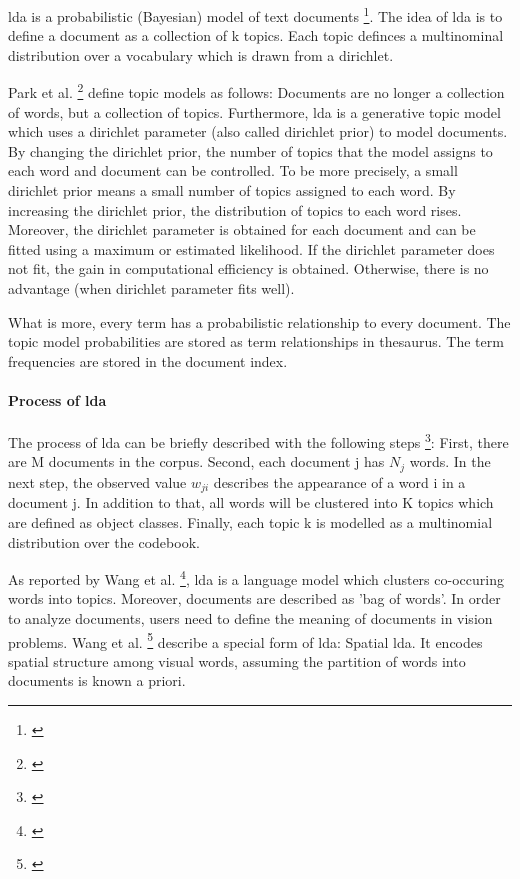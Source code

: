 \gls{lda} is a probabilistic (Bayesian) model of text documents \footnote{\autocite{hoffmann_2010}}. The idea of \gls{lda} is to define a document as a collection of k topics. Each topic definces a multinominal distribution over a vocabulary which is drawn from a dirichlet.

Park et al. \footnote{\autocite{park_2009}} define topic models as follows: Documents are no longer a collection of words, but a collection of topics. Furthermore, \gls{lda} is a generative topic model which uses a dirichlet parameter (also called dirichlet prior) to model documents. By changing the dirichlet prior, the number of topics that the model assigns to each word and document can be controlled. To be more precisely, a small dirichlet prior means a small number of topics assigned to each word. By increasing the dirichlet prior, the distribution of topics to each word rises. Moreover, the dirichlet parameter is obtained for each document and can be fitted using a maximum or estimated likelihood. If the dirichlet parameter does not fit, the gain in computational efficiency is obtained. Otherwise, there is no advantage (when dirichlet parameter fits well). 

What is more, every term has a probabilistic relationship to every document. The topic model probabilities are stored as term relationships in thesaurus. The term frequencies are stored in the document index.

\paragraph{Process of \gls{lda}}

The process of \gls{lda} can be briefly described with the following steps \footnote{\autocite{wang_2008}}: First, there are M documents in the corpus. Second, each document j has \(N_{j}\) words. In the next step, the observed value \(w_{ji}\) describes the appearance of a word i in a document j. In addition to that, all words will be clustered into K topics which are defined as object classes. Finally, each topic k is modelled as a multinomial distribution over the codebook.

As reported by Wang et al. \footnote{\autocite{wang_2008}}, \gls{lda} is a language model which clusters co-occuring words into topics. Moreover, documents are described as 'bag of words'. In order to analyze documents, users need to define the meaning of documents in vision problems. 
Wang et al. \footnote{\autocite{wang_2008}} describe a special form of \gls{lda}: Spatial \gls{lda}. It encodes spatial structure among visual words, assuming the partition of words into documents is known a priori. 

